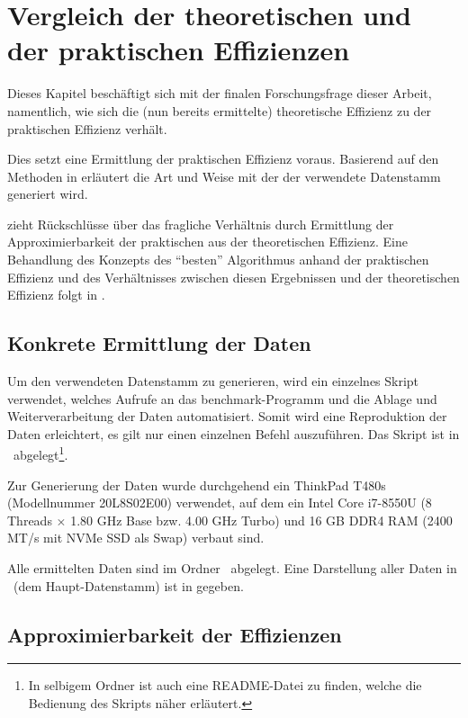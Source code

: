 \chapter{Vergleich der theoretischen und der praktischen Effizienzen}
\label{cha:vergleich}

Dieses Kapitel beschäftigt sich mit der finalen Forschungsfrage dieser Arbeit, namentlich, wie sich die (nun bereits ermittelte) theoretische Effizienz zu der praktischen Effizienz verhält.

Dies setzt eine Ermittlung der praktischen Effizienz voraus. Basierend auf den Methoden in  erläutert  die Art und Weise mit der der verwendete Datenstamm generiert wird.

 zieht Rückschlüsse über das fragliche Verhältnis durch Ermittlung der Approximierbarkeit der praktischen aus der theoretischen Effizienz. Eine Behandlung des Konzepts des \enquote{besten} Algorithmus anhand der praktischen Effizienz und des Verhältnisses zwischen diesen Ergebnissen und der theoretischen Effizienz folgt in .

\section{Konkrete Ermittlung der Daten}
\label{sec:data-generation}

Um den verwendeten Datenstamm zu generieren, wird ein einzelnes Skript verwendet, welches Aufrufe an das benchmark-Programm und die Ablage und Weiterverarbeitung der Daten automatisiert. Somit wird eine Reproduktion der Daten erleichtert, es gilt nur einen einzelnen Befehl auszuführen. Das Skript ist in \crScriptsGenerate\ abgelegt\footnote{In selbigem Ordner ist auch eine README-Datei zu finden, welche die Bedienung des Skripts näher erläutert.}.

Zur Generierung der Daten wurde durchgehend ein ThinkPad T480s (Modellnummer 20L8S02E00) verwendet, auf dem ein Intel Core i7-8550U (8 Threads $\times$ 1.80 GHz Base bzw. 4.00 GHz Turbo) und 16 GB DDR4 RAM (2400 MT/s mit NVMe SSD als Swap) verbaut sind.

Alle ermittelten Daten sind im Ordner \crData\ abgelegt. Eine Darstellung aller Daten in \crDataCanon\ (dem Haupt-Datenstamm) ist in  gegeben.

\section{Approximierbarkeit der Effizienzen}
\label{sec:approximation}

